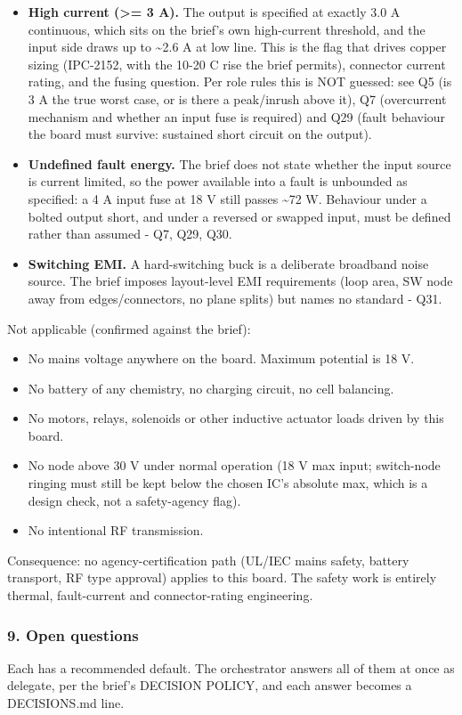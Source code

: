 \documentclass[11pt,a4paper]{article}
\begin{document}
\begin{itemize}
\item \textbf{High current (\textgreater{}= 3 A).} The output is specified at exactly 3.0 A continuous, which sits
on the brief's own high-current threshold, and the input side draws up to \textasciitilde{}2.6 A at low
line. This is the flag that drives copper sizing (IPC-2152, with the 10-20 C rise the
brief permits), connector current rating, and the fusing question. Per role rules this is
NOT guessed: see Q5 (is 3 A the true worst case, or is there a peak/inrush above it),
Q7 (overcurrent mechanism and whether an input fuse is required) and Q29 (fault behaviour
the board must survive: sustained short circuit on the output).
\item \textbf{Undefined fault energy.} The brief does not state whether the input source is current
limited, so the power available into a fault is unbounded as specified: a 4 A input fuse
at 18 V still passes \textasciitilde{}72 W. Behaviour under a bolted output short, and under a reversed
or swapped input, must be defined rather than assumed - Q7, Q29, Q30.
\item \textbf{Switching EMI.} A hard-switching buck is a deliberate broadband noise source. The brief
imposes layout-level EMI requirements (loop area, SW node away from edges/connectors, no
plane splits) but names no standard - Q31.
\end{itemize}
Not applicable (confirmed against the brief):

\begin{itemize}
\item No mains voltage anywhere on the board. Maximum potential is 18 V.
\item No battery of any chemistry, no charging circuit, no cell balancing.
\item No motors, relays, solenoids or other inductive actuator loads driven by this board.
\item No node above 30 V under normal operation (18 V max input; switch-node ringing must
still be kept below the chosen IC's absolute max, which is a design check, not a
safety-agency flag).
\item No intentional RF transmission.
\end{itemize}
Consequence: no agency-certification path (UL/IEC mains safety, battery transport, RF type approval) applies to this board. The safety work is entirely thermal, fault-current and connector-rating engineering.

\subsubsection*{9. Open questions}
Each has a recommended default. The orchestrator answers all of them at once as delegate, per the brief's DECISION POLICY, and each answer becomes a DECISIONS.md line.
\end{document}

